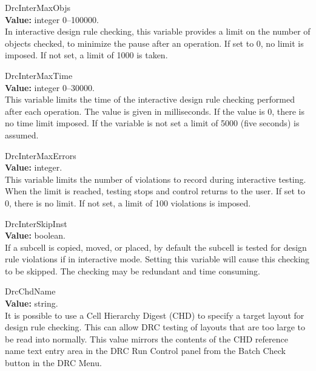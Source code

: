 \begin{description}
\item{\et DrcInterMaxObjs}\\
{\bf Value:} integer 0--100000.\\
In interactive design rule checking, this variable provides a limit on
the number of objects checked, to minimize the pause after an
operation.  If set to 0, no limit is imposed.  If not set, a limit of
1000 is taken.

\item{\et DrcInterMaxTime}\\
{\bf Value:} integer 0--30000.\\
This variable limits the time of the interactive design rule checking
performed after each operation.  The value is given in milliseconds. 
If the value is 0, there is no time limit imposed.  If the variable
is not set a limit of 5000 (five seconds) is assumed.

\item{\et DrcInterMaxErrors}\\
{\bf Value:} integer.\\
This variable limits the number of violations to record during
interactive testing.  When the limit is reached, testing stops and
control returns to the user.  If set to 0, there is no limit.  If not
set, a limit of 100 violations is imposed.

\item{\et DrcInterSkipInst}\\
{\bf Value:} boolean.\\
If a subcell is copied, moved, or placed, by default the subcell is
tested for design rule violations if in interactive mode.  Setting
this variable will cause this checking to be skipped.  The checking
may be redundant and time consuming.

\item{\et DrcChdName}\\
{\bf Value:} string.\\
It is possible to use a Cell Hierarchy Digest (CHD) to specify a
target layout for design rule checking.  This can allow DRC testing of
layouts that are too large to be read into {\Xic} normally.  This
value mirrors the contents of the {\cb CHD reference name} text entry
area in the {\cb DRC Run Control} panel from the {\cb Batch Check}
button in the {\cb DRC Menu}.


\end{description}
